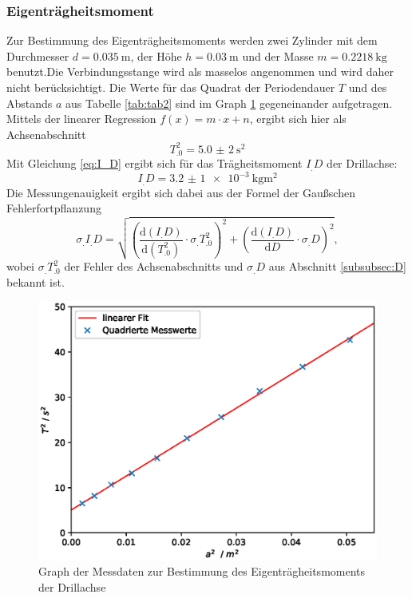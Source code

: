 \subsubsection{Eigenträgheitsmoment}\label{subsubsec:I_D}
Zur Bestimmung des Eigenträgheitsmoments werden zwei Zylinder mit dem Durchmesser $d = \SI{0,035}{\metre}$, der Höhe $h = \SI{0,03}{\metre}$ und der Masse $m = \SI{0,2218}{\kilogram}$ benutzt.\newline Die Verbindungsstange wird als masselos angenommen und wird daher nicht berücksichtigt.
Die Werte für das Quadrat der Periodendauer $T$ und des Abstands $a$ aus Tabelle \ref{tab:tab2} sind im Graph \ref{fig:abb2} gegeneinander aufgetragen. Mittels der linearer Regression $f(x) = m \cdot x + n$\cite{matplotlib}, ergibt sich hier als Achsenabschnitt \[T_.0^2=\SI{5,0(2)}{\second\squared}\]
Mit Gleichung \eqref{eq:I_D} ergibt sich für das Trägheitsmoment $I_.D$ der Drillachse:
\[I_.D=\SI{3,2(1)e-3}{\kilogram\metre\squared}\]
Die Messungenauigkeit ergibt sich dabei aus der Formel der Gaußschen Fehlerfortpflanzung
\[\sigma_.{I_.D}= \sqrt{\left(\frac{\mathrm{d}(I_.D)}{\mathrm{d}(T^2_.0)} \cdot \sigma_.{T^2_.0}\right)^2+\left(\frac{\mathrm{d}(I_.D)}{\mathrm{d}D}\cdot\sigma_.D\right)^2},\]
wobei $\sigma_.{T^2_.0}$ der Fehler des Achsenabschnitts und $\sigma_.D$ aus Abschnitt \ref{subsubsec:D} bekannt ist.
\begin{figure}
\centering
\includegraphics[scale = .75,keepaspectratio]
	{content/images/plot1.eps}
\caption{Graph der Messdaten zur Bestimmung des Eigenträgheitsmoments der Drillachse}\label{fig:abb2}
\end{figure}
